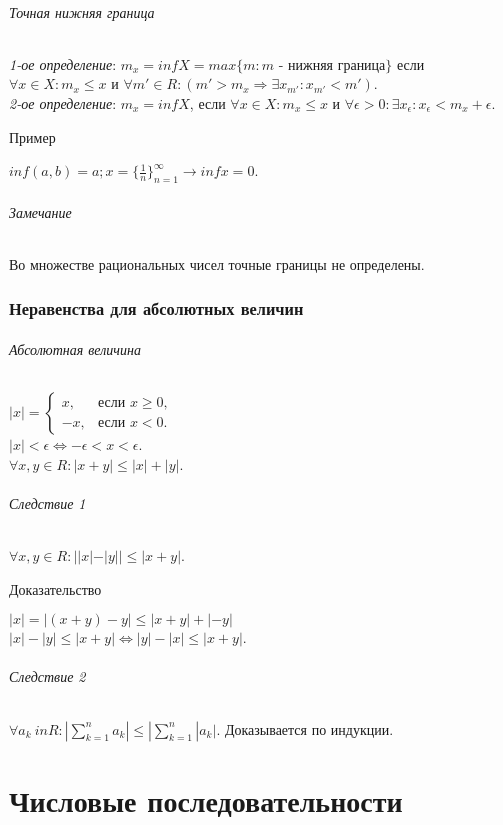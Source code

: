 \documentclass[10pt]{article}
\begin{document}
			\paragraph{Точная нижняя граница}
			\textit{1-ое определение}: $m_x = inf X = max \{m : m \mbox{ - нижняя граница}\}$ если $\forall x \in X : m_x \le x$ и $\forall m' \in R : (m' > m_x \Rightarrow \exists x_{m'} : x_{m'} < m')$.\\
			\textit{2-ое определение}: $m_x = inf X$, если $\forall x \in X : m_x \le x$ и $\forall \epsilon > 0 : \exists x_\epsilon : x_\epsilon < m_x + \epsilon$.
			\subparagraph{Пример}
			$inf (a,b) = a; x = \{\frac{1}{n}\}_{n=1}^\infty \to inf x = 0$.
			\paragraph{Замечание} Во множестве рациональных чисел точные границы не определены.
	\section{Неравенства для абсолютных величин}
		\paragraph{Абсолютная величина}
		$|x| = 
		\begin{cases}
		x,&\text{если } x \geq 0,\\
		-x,&\text{если } x < 0.
		\end{cases}$\\
		$|x| < \epsilon \Leftrightarrow -\epsilon < x < \epsilon$.\\
		$\forall x,y \in R : |x + y| \le |x| + |y|$.
		\paragraph{Следствие 1}
		$\forall x,y \in R : | |x| - |y| | \le |x + y|$.
		\subparagraph{Доказательство}
		$|x| = |(x+y) - y| \le |x+y| + |-y|$\\
		$|x| - |y| \le |x + y| \Leftrightarrow |y| - |x| \le |x + y|$.
		\paragraph{Следствие 2}
		$\forall a_k \ in R : |\sum\limits_{k = 1}^{n} a_k| \le | \sum\limits_{k=1}^{n}  |a_k|$. Доказывается по индукции.
		
\part{Числовые последовательности}
	
\end{document}
